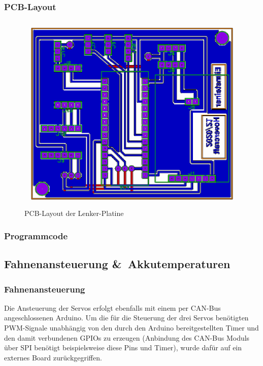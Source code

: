 \newpage

\subsubsection{PCB-Layout}
\begin{figure}[h]
    \centering
    \includegraphics[width=1.0\textwidth]{../Proteus/Exports/Lenker_Platine_PCB.png}    
    \caption{PCB-Layout der Lenker-Platine}
\end{figure}

\newpage
\subsubsection{Programmcode}


\newpage

\subsection{Fahnenansteuerung \&\ Akkutemperaturen}
\subsubsection{Fahnenansteuerung}
Die Ansteuerung der Servos erfolgt ebenfalls mit einem per CAN-Bus angeschlossenen Arduino. Um die für die Steuerung der drei Servos benötigten PWM-Signale unabhängig von den durch den Arduino bereitgestellten Timer und den damit verbundenen GPIOs zu erzeugen 
(Anbindung des CAN-Bus Moduls über SPI benötigt beispielsweise diese Pins und Timer), wurde dafür auf ein externes Board zurückgegriffen.

